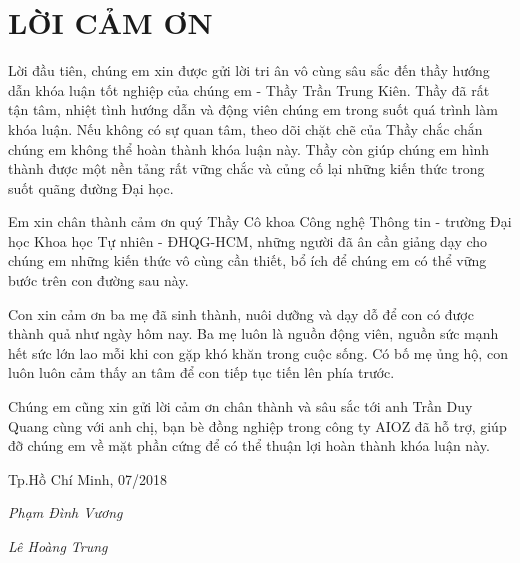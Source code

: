 \newpage
\chapter*{LỜI CẢM ƠN}
Lời đầu tiên, chúng em xin được gửi lời tri ân vô cùng sâu sắc đến thầy hướng dẫn khóa luận tốt nghiệp của chúng em - Thầy Trần Trung Kiên. Thầy đã rất tận tâm, nhiệt tình hướng dẫn và động viên chúng em trong suốt quá trình làm khóa luận. Nếu không có sự quan tâm, theo dõi chặt chẽ của Thầy chắc chắn chúng em không thể hoàn thành khóa luận này. Thầy còn giúp chúng em hình thành được một nền tảng rất vững chắc và củng cố lại những kiến thức trong suốt quãng đường Đại học.

Em xin chân thành cảm ơn quý Thầy Cô khoa Công nghệ Thông tin - trường Đại học Khoa học Tự nhiên - ĐHQG-HCM, những người đã ân cần giảng dạy cho chúng em những kiến thức vô cùng cần thiết, bổ ích để chúng em có thể vững bước trên con đường sau này.

Con xin cảm ơn ba mẹ đã sinh thành, nuôi dưỡng và dạy dỗ để con có được thành quả như ngày hôm nay. Ba mẹ luôn là nguồn động viên, nguồn sức mạnh hết sức lớn lao mỗi khi con gặp khó khăn trong cuộc sống. Có bố mẹ ủng hộ, con luôn luôn cảm thấy an tâm để con tiếp tục tiến lên phía trước.

Chúng em cũng xin gửi lời cảm ơn chân thành và sâu sắc tới anh Trần Duy Quang cùng với anh chị, bạn bè đồng nghiệp trong công ty AIOZ đã hỗ trợ, giúp đỡ chúng em về mặt phần cứng để có thể thuận lợi hoàn thành khóa luận này.



\hfill Tp.Hồ Chí Minh, 07/2018

\hfill \textit{Phạm Đình Vương}

\hfill \textit{Lê Hoàng Trung}
